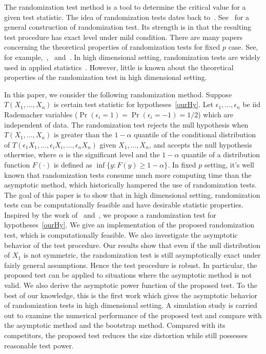 \documentclass[3p]{elsarticle}
\theoremstyle{plain}
\theoremstyle{definition}
\theoremstyle{remark}
\begin{document}
The randomization test method is a tool to determine the critical value for a given test statistic.
The idea of randomization tests dates back to~\citet{Fisher}.
See~\citet{Romano1990On} for a general construction of randomization test.
Its strength is in that the resulting test procedure has exact level under mild condition.
There are many papers concerning the theoretical properties of randomization tests for fixed $p$ case.
See, for example,~\citet{Romano1990On},~\citet{Zhu2000N} and~\citet{Chung2016Multivariate}.
In high dimensional setting, randomization tests are widely used in applied statistics~\citep{Subramanian2005,efron2007on,Ko2016}.
However, little is known about the theoretical properties of the randomization test in high dimensional setting.

In this paper, we consider the following randomization method.
Suppose $T(X_1,\ldots,X_n)$ is certain test statistic for hypotheses~\eqref{ourHy}.
Let $\epsilon_1,\ldots,\epsilon_n$ be iid Rademacher variables ($\Pr(\epsilon_i=1)=\Pr(\epsilon_i=-1)=1/2$) which are independent of data.
 The randomization test rejects the null hypothesis when $T(X_1,\ldots, X_n)$ is greater than the $1-\alpha$ quantile of the conditional distribution of $T(\epsilon_1 X_1,\ldots,\epsilon_i X_i,\ldots,\epsilon_n X_n)$ given $X_1,\ldots,X_n$,
 and accepts the null hypothesis otherwise, where $\alpha$ is the significant level and the $1-\alpha$ quantile of a distribution function $F(\cdot)$ is defined as $\inf\{y: F(y)\geq 1-\alpha\}$.
In fixed $p$ setting, it's well known that randomization tests consume much more computing time than the asymptotic method, which  historically  hampered the use of randomization tests. 
The goal of this paper is to show that in high dimensional setting, randomization tests can be computationally feasible and have desirable statistic properties.
Inspired by the work of~\citet{Bai1996Efiect} and~\citet{Chen2010A}, we propose a randomization test for hypotheses~\eqref{ourHy}.
We give an implementation of the proposed randomization test, which is computationally feasible.
We also investigate the asymptotic behavior of the test procedure.
Our results show that even if the null distribution of $X_1$ is not symmetric, the randomization test is still asymptotically exact under fairly general assumptions. 
Hence the test procedure is robust.
In particular, the proposed test can be applied to situations where the asymptotic method is not valid.
We also derive the asymptotic power function of the proposed test.
To the best of our knowledge, this is the first work which gives the asymptotic behavior of randomization tests in high dimensional setting.
A simulation study is carried out to examine the numerical performance of the proposed test and compare with the asymptotic method and the bootstrap method.
Compared with its competitors, the proposed test reduces the size distortion while still possesses reasonable test power.
\end{document}
